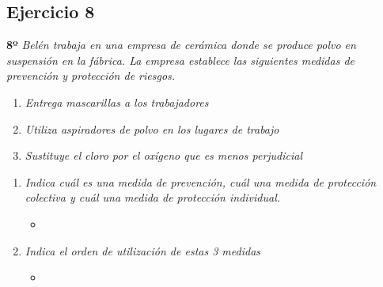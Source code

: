 \documentclass{article}
\begin{document}
      \newpage
        \subsection{Ejercicio 8}
          \textbf{8º} \textit{ Belén trabaja en una empresa de cerámica donde se produce polvo en suspensión en la fábrica. La empresa establece las siguientes medidas de prevención y protección de riesgos.}
          \\
          \begin{enumerate}[label=(\alph*)]
            \item \textit{Entrega mascarillas a los trabajadores}

            \item \textit{Utiliza aspiradores de polvo en los lugares de trabajo}

            \item \textit{Sustituye el cloro por el oxígeno que es menos perjudicial}
          \end{enumerate}
          
          \begin{enumerate}[label=(\alph*)]
            \item \textit{Indica cuál es una medida de prevención, cuál una medida de protección colectiva y cuál una medida de protección individual.}
              \begin{itemize}
                \item 
              \end{itemize}
            \item \textit{Indica el orden de utilización de estas 3 medidas}
              \begin{itemize}
                \item 
              \end{itemize}
          \end{enumerate}
  
        \newpage
\end{document}
